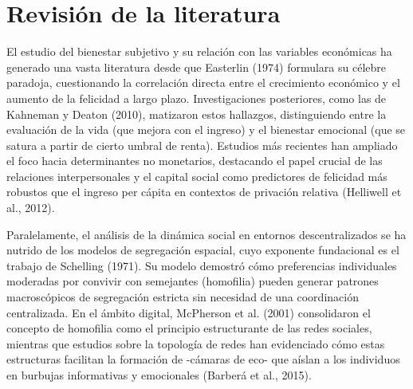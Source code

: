 \documentclass[a4paper,12pt]{article}
\begin{document}
\newpage

\section{Revisión de la literatura}

El estudio del bienestar subjetivo y su relación con las variables económicas ha generado una vasta literatura desde que Easterlin (1974) formulara su célebre paradoja, cuestionando la correlación directa entre el crecimiento económico y el aumento de la felicidad a largo plazo. Investigaciones posteriores, como las de Kahneman y Deaton (2010), matizaron estos hallazgos, distinguiendo entre la evaluación de la vida (que mejora con el ingreso) y el bienestar emocional (que se satura a partir de cierto umbral de renta). Estudios más recientes han ampliado el foco hacia determinantes no monetarios, destacando el papel crucial de las relaciones interpersonales y el capital social como predictores de felicidad más robustos que el ingreso per cápita en contextos de privación relativa (Helliwell et al., 2012).

Paralelamente, el análisis de la dinámica social en entornos descentralizados se ha nutrido de los modelos de segregación espacial, cuyo exponente fundacional es el trabajo de Schelling (1971). Su modelo demostró cómo preferencias individuales moderadas por convivir con semejantes (homofilia) pueden generar patrones macroscópicos de segregación estricta sin necesidad de una coordinación centralizada. En el ámbito digital, McPherson et al. (2001) consolidaron el concepto de homofilia como el principio estructurante de las redes sociales, mientras que estudios sobre la topología de redes han evidenciado cómo estas estructuras facilitan la formación de -cámaras de eco- que aíslan a los individuos en burbujas informativas y emocionales (Barberá et al., 2015).
\end{document}
